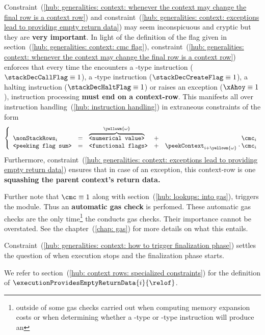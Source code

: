 \saNote{} \label{hub: generalities: context: consequences of CMC and XAHOY}
Constraint~(\ref{hub: generalities: context: whenever the context may change the final row is a context row}) and
constraint~(\ref{hub: generalities: context: exceptions lead to providing empty return data})
may seem inconspicuous and cryptic but they are \textbf{very important}.
In light of the definition of the \CONTEXTMAYCHANGE{} flag given in section~(\ref{hub: generalities: context: cmc flag}),
constraint~(\ref{hub: generalities: context: whenever the context may change the final row is a context row})
enforces that every time the \zkEvm{} encounters
a -type instruction ($\stackDecCallFlag \equiv 1$),
a -type instruction ($\stackDecCreateFlag \equiv 1$),
a halting instruction ($\stackDecHaltFlag \equiv 1$) or
raises an exception ($\xAhoy \equiv 1$),
instruction processing \textbf{must end on a context-row}.
This manifests all over instruction handling~(\ref{hub: instruction handling})
in extraneous constraints of the form
\[
	\left\{ \begin{array}{lclcr}
		\nonStackRows _{i}          & = & \overbrace{\texttt{<numerical value>}}^{\yellowm{\omega}} & + & \cmc_{i}                                           \\
		\texttt{<peeking flag sum>} & = & \texttt{<functional flags>}                              & + & \peekContext_{i + \yellowm{\omega}} \cdot \cmc_{i} \\
	\end{array} \right.
\]
Furthermore,
constraint~(\ref{hub: generalities: context: exceptions lead to providing empty return data})
ensures that in case of an exception, this context-row is one \textbf{squashing the parent context's return data.}

\saNote{} \label{hub: generalities: context: automatic gas checks}
Further note that $\cmc \equiv 1$ along with section~(\ref{hub: lookups: into gas}), triggers the \gasMod{} module.
Thus an \textbf{automatic gas check} is perfomed.
These automatic gas checks are the only time\footnote{outside of some gas checks carried out when computing memory expansion costs or when determining whether a -type or -type instruction will produce an \oogxSH{}} the \zkEvm{} conducts gas checks.
Their importance cannot be overstated.
See the \gasMod{} chapter~(\ref{chap: gas}) for more details on what this entails.

\saNote{} Constraint~(\ref{hub: generalities: context: how to trigger finalization phase}) settles the question of when execution stops and the finalization phase starts.

\saNote{} We refer to section~(\ref{hub: context rows: specialized constraints}) for the definition of $\executionProvidesEmptyReturnData {i}{\relof}$.
